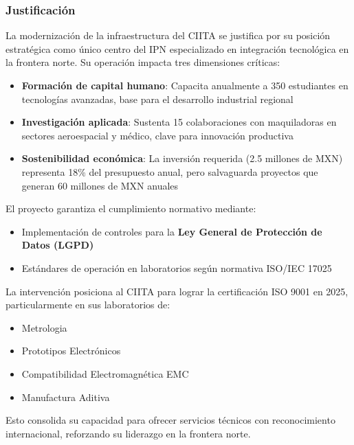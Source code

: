 \subsubsection{Justificación}
La modernización de la infraestructura del CIITA se justifica por su posición estratégica como único centro del IPN especializado en integración tecnológica en la frontera norte. Su operación impacta tres dimensiones críticas:

\begin{itemize}
	\item \textbf{Formación de capital humano}: Capacita anualmente a 350 estudiantes en tecnologías avanzadas, base para el desarrollo industrial regional \cite{ipn2023}
	\item \textbf{Investigación aplicada}: Sustenta 15 colaboraciones con maquiladoras en sectores aeroespacial y médico, clave para innovación productiva \cite{ipn2023}
	\item \textbf{Sostenibilidad económica}: La inversión requerida (2.5 millones de MXN) representa 18\% del presupuesto anual, pero salvaguarda proyectos que generan 60 millones de MXN anuales \cite{ipn2023}
\end{itemize}

El proyecto garantiza el cumplimiento normativo mediante:
\begin{itemize}
	\item Implementación de controles para la \textbf{Ley General de Protección de Datos (LGPD)}
	\item Estándares de operación en laboratorios según normativa ISO/IEC 17025
\end{itemize}

La intervención posiciona al CIITA para lograr la certificación ISO 9001 en 2025, particularmente en sus laboratorios de:
\begin{itemize}
	\item Metrologia
	\item Prototipos Electrónicos
	\item  Compatibilidad Electromagnética EMC
	\item  Manufactura Aditiva
\end{itemize}

Esto consolida su capacidad para ofrecer servicios técnicos con reconocimiento internacional, reforzando su liderazgo en la frontera norte.